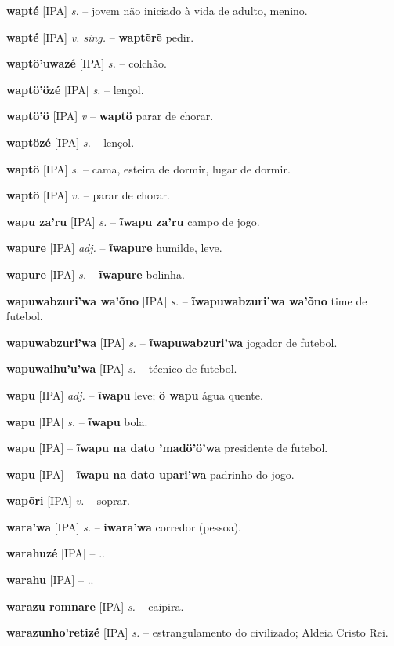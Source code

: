 \textbf{wapté} [IPA] \textit{s.} -- jovem não iniciado à vida de adulto, menino.

\textbf{wapté} [IPA] \textit{v. sing.} -- \textbf{waptẽrẽ} pedir.

\textbf{waptö'uwazé} [IPA] \textit{s.} -- colchão.

\textbf{waptö'özé} [IPA] \textit{s.} -- lençol.

\textbf{waptö'ö} [IPA] \textit{v} -- \textbf{waptö} parar de chorar.

\textbf{waptözé} [IPA] \textit{s.} -- lençol.

\textbf{waptö} [IPA] \textit{s.} -- cama, esteira de dormir, lugar de dormir.

\textbf{waptö} [IPA] \textit{v.} -- parar de chorar.

\textbf{wapu za'ru} [IPA] \textit{s.} -- \textbf{ĩwapu za'ru} campo de jogo.

\textbf{wapure} [IPA] \textit{adj.} -- \textbf{ĩwapure} humilde, leve.

\textbf{wapure} [IPA] \textit{s.} -- \textbf{ĩwapure} bolinha.

\textbf{wapuwabzuri'wa wa'õno} [IPA] \textit{s.} -- \textbf{ĩwapuwabzuri'wa wa'õno} time de futebol.

\textbf{wapuwabzuri'wa} [IPA] \textit{s.} -- \textbf{ĩwapuwabzuri'wa} jogador de futebol.

\textbf{wapuwaihu'u'wa} [IPA] \textit{s.} -- técnico de futebol.

\textbf{wapu} [IPA] \textit{adj.} -- \textbf{ĩwapu} leve; \textbf{ö wapu} água quente.

\textbf{wapu} [IPA] \textit{s.} -- \textbf{ĩwapu} bola.

\textbf{wapu} [IPA] \textit{} -- \textbf{ĩwapu na dato 'madö'ö'wa} presidente de futebol.

\textbf{wapu} [IPA] \textit{} -- \textbf{ĩwapu na dato upari'wa} padrinho do jogo.

\textbf{wapõri} [IPA] \textit{v.} -- soprar.

\textbf{wara'wa} [IPA] \textit{s.} -- \textbf{iwara'wa} corredor (pessoa).

\textbf{warahuzé} [IPA] \textit{} -- ..

\textbf{warahu} [IPA] \textit{} -- ..

\textbf{warazu romnare} [IPA] \textit{s.} -- caipira.

\textbf{warazunho'retizé} [IPA] \textit{s.} -- estrangulamento do civilizado; Aldeia Cristo Rei.

